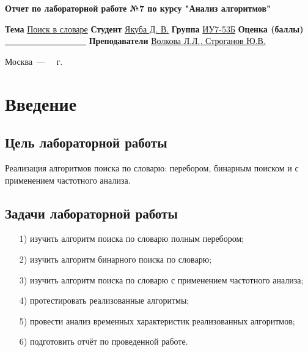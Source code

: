 \documentclass[12pt]{report}
\begin{document}
\begin{titlepage}
	
	\begin{center}
		\Large\textbf{Отчет по лабораторной работе №7 по курсу "Анализ алгоритмов"}\newline
	\end{center}
	
	\noindent\textbf{Тема} \underline{Поиск в словаре}\newline\newline\newline
	\noindent\textbf{Студент} \underline{Якуба Д. В.}\newline\newline
	\noindent\textbf{Группа} \underline{ИУ7-53Б}\newline\newline
	\noindent\textbf{Оценка (баллы)} \underline{~~~~~~~~~~~~~~~~~~~}\newline\newline
	\noindent\textbf{Преподаватели} \underline{Волкова Л.Л., Строганов Ю.В.}\newline
	
	\begin{center}
		\vfill
		Москва~---~\the\year
		~г.
	\end{center}
\end{titlepage}

\setcounter{page}{2}

\tableofcontents

\newpage
\chapter*{Введение}
\section*{Цель лабораторной работы}
Реализация алгоритмов поиска по словарю: перебором, бинарным поиском и с применением частотного анализа.
\section*{Задачи лабораторной работы}
\begin{enumerate}
\item[1)] изучить алгоритм поиска по словарю полным перебором;
\item[2)] изучить алгоритм бинарного поиска по словарю;
\item[3)] изучить алгоритм поиска по словарю с применением частотного анализа;
\item[4)] протестировать реализованные алгоритмы;
\item[5)] провести анализ временных характеристик реализованных алгоритмов;
\item[6)] подготовить отчёт по проведенной работе.
\end{enumerate}
\end{document}
